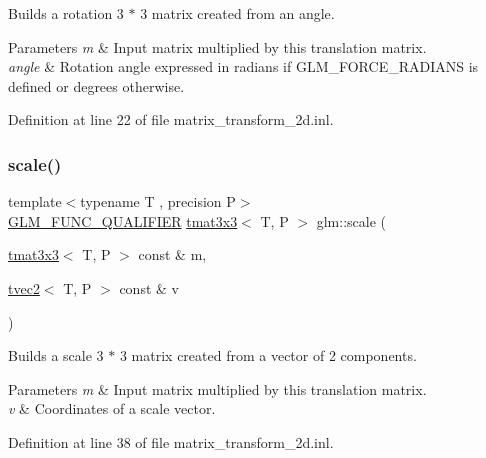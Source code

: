 Builds a rotation 3 $\ast$ 3 matrix created from an angle.


\begin{DoxyParams}{Parameters}
{\em m} & Input matrix multiplied by this translation matrix. \\
\hline
{\em angle} & Rotation angle expressed in radians if G\+L\+M\+\_\+\+F\+O\+R\+C\+E\+\_\+\+R\+A\+D\+I\+A\+NS is defined or degrees otherwise. \\
\hline
\end{DoxyParams}


Definition at line 22 of file matrix\+\_\+transform\+\_\+2d.\+inl.

\mbox{\label{group__gtx__matrix__transform__2d_gadb9f2a729d399ae5e9c33eb64d0d66fe}} 
\subsubsection{\texorpdfstring{scale()}{scale()}}
{\footnotesize\ttfamily template$<$typename T , precision P$>$ \\
\mbox{\hyperlink{setup_8hpp_a33fdea6f91c5f834105f7415e2a64407}{G\+L\+M\+\_\+\+F\+U\+N\+C\+\_\+\+Q\+U\+A\+L\+I\+F\+I\+ER}} \mbox{\hyperlink{structglm_1_1tmat3x3}{tmat3x3}}$<$ T, P $>$ glm\+::scale (\begin{DoxyParamCaption}\item[{\mbox{\hyperlink{structglm_1_1tmat3x3}{tmat3x3}}$<$ T, P $>$ const \&}]{m,  }\item[{\mbox{\hyperlink{structglm_1_1tvec2}{tvec2}}$<$ T, P $>$ const \&}]{v }\end{DoxyParamCaption})}

Builds a scale 3 $\ast$ 3 matrix created from a vector of 2 components.


\begin{DoxyParams}{Parameters}
{\em m} & Input matrix multiplied by this translation matrix. \\
\hline
{\em v} & Coordinates of a scale vector. \\
\hline
\end{DoxyParams}


Definition at line 38 of file matrix\+\_\+transform\+\_\+2d.\+inl.

\mbox{\label{group__gtx__matrix__transform__2d_gab3363478cb625e40c5bd924fd838cf54}} 
